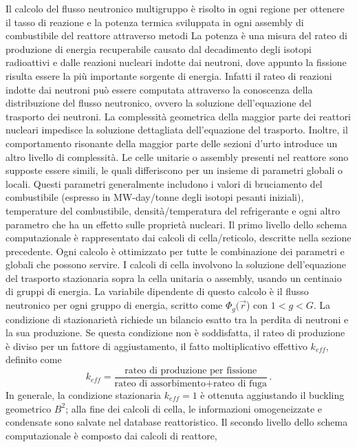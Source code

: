 Il calcolo del flusso neutronico multigruppo è risolto in ogni regione per 
ottenere il tasso di reazione e la potenza termica sviluppata in ogni assembly 
di combustibile del reattore attraverso metodi
La potenza è una misura del rateo di produzione di energia recuperabile causato 
dal decadimento degli isotopi radioattivi e dalle reazioni nucleari indotte dai 
neutroni, dove appunto la fissione risulta essere la più importante sorgente di 
energia. 
Infatti il rateo di reazioni indotte dai neutroni può essere computata 
attraverso la conoscenza della distribuzione del flusso neutronico, ovvero la 
soluzione dell'equazione del trasporto dei neutroni.
La complessità geometrica della maggior parte dei reattori nucleari impedisce 
la 
soluzione dettagliata dell'equazione del trasporto. Inoltre, il comportamento 
risonante della maggior parte delle sezioni d'urto introduce un altro livello 
di 
complessità. 
Le celle unitarie o assembly presenti nel reattore sono supposte essere 
simili, 
le quali differiscono per un insieme di parametri globali o locali. Questi 
parametri generalmente includono i valori di bruciamento del combustibile 
(espresso in MW-day/tonne degli isotopi pesanti iniziali), temperature del 
combustibile, densità/temperatura del refrigerante e ogni altro parametro che 
ha 
un effetto sulle proprietà nucleari.
Il primo livello dello schema computazionale è rappresentato dai calcoli di 
cella/reticolo, descritte nella sezione precedente. Ogni calcolo è ottimizzato 
per tutte le combinazione dei parametri e globali che possono servire. I 
calcoli 
di cella involvono la soluzione dell'equazione del trasporto stazionaria sopra 
la cella unitaria o assembly, usando un centinaio di gruppi di energia. La 
variabile dipendente di questo calcolo è il flusso neutronico per ogni gruppo 
di 
energia, scritto come $\Phi_g(\vec{r}$) con $1<g<G$. La condizione di 
stazionarietà richiede un bilancio esatto tra la perdita di neutroni e la sua 
produzione. Se questa condizione non è soddisfatta, il rateo di produzione è 
diviso per un fattore di aggiustamento, il fatto moltiplicativo effettivo 
$k_{eff}$, definito come
\begin{equation}
k_{eff}=\frac{\text{rateo di produzione per fissione}}{\text{rateo di 
assorbimento+rateo di fuga}} \,.
\end{equation}
In generale, la condizione stazionaria $k_{eff}=1$ è ottenuta aggiustando il 
buckling geometrico $B^2$; alla fine dei calcoli di cella, le informazioni 
omogeneizzate e 
condensate sono salvate nel database reattoristico.
Il secondo livello dello schema computazionale è composto dai calcoli di reattore, 
